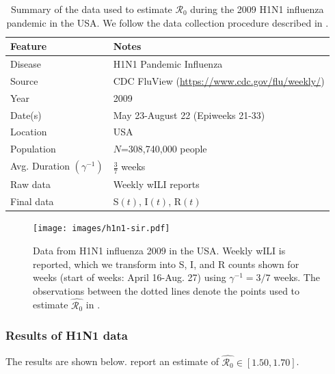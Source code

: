 \documentclass[12pt]{article}
\newcommand{\rr}{\ensuremath{\mathcal{R}_0}}
\begin{document}
\begin{table}[H]
\centering
\begin{tabular}{@{}ll@{}}
\toprule
Feature       & Notes                                                                   \\ \midrule
Disease       & H1N1 Pandemic Influenza                                                 \\
Source        & CDC FluView (\url{https://www.cdc.gov/flu/weekly/})      \\
Year          & 2009                                                                    \\
Date(s)          & May 23-August 22 (Epiweeks 21-33)                                       \\
Location      & USA                                                                     \\
Population    & $N$=308,740,000 people                                                  \\
  Avg. Duration $\left ( \gamma^{-1}\right )$ & $\frac{3}{7}$ weeks\\
  Raw data & Weekly wILI reports\\
  Final data & S$(t)$, I$(t)$, R$(t)$ \\\bottomrule
\end{tabular}
\caption{Summary of the data used to estimate $\rr$ during the 2009 H1N1 influenza pandemic in the USA.  We follow the data collection procedure described in \cite{towers2009}.}
\label{tab:h1n1-data}
\end{table}

\begin{figure}[H]
  \centering
  \texttt{[image: images/h1n1-sir.pdf]}
  \caption{Data from H1N1 influenza 2009 in the USA.  Weekly wILI is reported, which we transform into S, I, and R counts shown for weeks (start of weeks: April 16-Aug. 27)  using $\gamma^{-1} = 3/7$ weeks.  The observations between the dotted lines denote the points used to estimate $\hat{\rr}$ in \cite{towers2009}.}
  \end{figure}
      

      \subsubsection{Results of H1N1 data}
      The results are shown below.  \cite{towers2009} report an estimate of $\hat{\rr} \in [1.50, 1.70]$.
\end{document}
